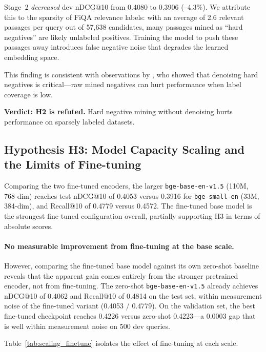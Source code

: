 \documentclass{article} %
\begin{document}
Stage~2 \emph{decreased} dev nDCG@10 from 0.4080 to 0.3906 (--4.3\%).
We attribute this to the sparsity of FiQA relevance labels: with an average of 2.6 relevant passages per query out of 57,638 candidates, many passages mined as ``hard negatives'' are likely unlabeled positives.
Training the model to push these passages away introduces false negative noise that degrades the learned embedding space.

This finding is consistent with observations by \citet{qu2021rocketqa}, who showed that denoising hard negatives is critical---raw mined negatives can hurt performance when label coverage is low.

\textbf{Verdict: H2 is refuted.} Hard negative mining without denoising hurts performance on sparsely labeled datasets.

\subsection{Hypothesis H3: Model Capacity Scaling and the Limits of Fine-tuning}

Comparing the two fine-tuned encoders, the larger \texttt{bge-base-en-v1.5} (110M, 768-dim) reaches test nDCG@10 of 0.4053 versus 0.3916 for \texttt{bge-small-en} (33M, 384-dim), and Recall@10 of 0.4779 versus 0.4572.
The fine-tuned base model is the strongest fine-tuned configuration overall, partially supporting H3 in terms of absolute scores.

\paragraph{No measurable improvement from fine-tuning at the base scale.}
However, comparing the fine-tuned base model against its own zero-shot baseline reveals that the apparent gain comes entirely from the stronger pretrained encoder, not from fine-tuning.
The zero-shot \texttt{bge-base-en-v1.5} already achieves nDCG@10 of 0.4062 and Recall@10 of 0.4814 on the test set, within measurement noise of the fine-tuned variant (0.4053 / 0.4779).
On the validation set, the best fine-tuned checkpoint reaches 0.4226 versus zero-shot 0.4223---a 0.0003 gap that is well within measurement noise on 500 dev queries.

Table~\ref{tab:scaling_finetune} isolates the effect of fine-tuning at each scale.
\end{document}
